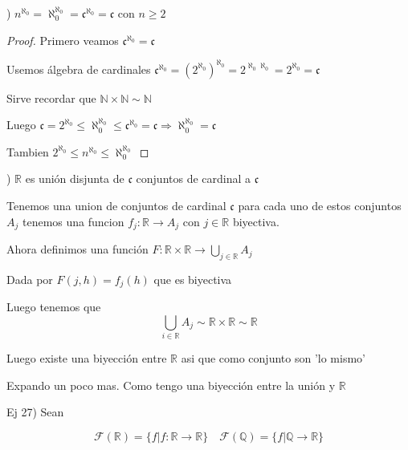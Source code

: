 \documentclass[12pt]{article}
\newcommand{\n}{\aleph_{0}}
\newcommand{\Q}{\mathbb{Q}}
\newcommand{\R}{\mathbb{R}}
\newcommand{\N}{\mathbb{N}}
\newcommand{\Ra}{\Rightarrow}
\newcommand{\ra}{\rightarrow}
\theoremstyle{definition}
\begin{document}
) $n^{\n} = \n^{\n} = \mathfrak{c}^{\n} = \mathfrak{c}$ con $n \geq 2$

\begin{proof}
  Primero veamos $\mathfrak{c}^{\n} = \mathfrak{c}$

  Usemos álgebra de cardinales $\mathfrak{c}^{\n} = (2^{\n})^{\n} = 2^{\n \n} = 2^{\n} = \mathfrak{c} \quad $ 

  Sirve recordar que $\N \times \N \sim \N$

  Luego $\mathfrak{c}  = 2^{\n} \leq \n^{\n} \leq \mathfrak{c}^{\n} = \mathfrak{c} \Ra \n^{\n} = \mathfrak{c}$

  Tambien $2^{\n} \leq n^{\n} \leq \n^{\n}$
\end{proof}

) $\R$ es unión disjunta de $\mathfrak{c}$ conjuntos de cardinal a $\mathfrak{c}$

Tenemos una union de conjuntos de cardinal $\mathfrak{c}$ para cada uno de estos conjuntos $A_{j}$ tenemos una funcion $f_{j} : \R \ra A_{j}$ con $j \in \R$ biyectiva.

Ahora definimos una función $F: \R \times \R \ra \bigcup_{j \in \R} A_{j}$

Dada por $F(j,h) = f_{j}(h)$ que es biyectiva

Luego tenemos que $$\bigcup_{i \in \R} A_{j} \sim \R \times \R \sim \R  $$

Luego existe una biyección entre $\R $ asi que como conjunto son 'lo mismo'

Expando un poco mas. Como tengo una biyección entre la unión y $\R$

\noindent Ej 27) Sean 

$$ \mathcal{F}(\R) = \{f | f:\R \ra \R \} \quad \mathcal{F}(\Q) = \{f | \Q \ra \R \}$$
\end{document}
